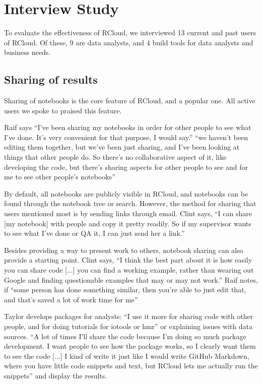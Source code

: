 \section{Interview Study\label{sec:interviews}}

To evaluate the effectiveness of RCloud, we interviewed 13 current and past
users of RCloud. Of these, 9 are data analysts, and 4 build tools for data
analysts and business needs.


\subsection{Sharing of results}
Sharing of notebooks is the core feature of RCloud, and a popular one. All
active users we spoke to praised this feature.


Raif says ``I've been sharing my notebooks in order for other people to see what
I've done. It's very convenient for that purpose, I would say.'' ``we haven't
been editing them together, but we've been just sharing, and I've been looking
at things that other people do. So there's no collaborative aspect of it, like
developing the code, but there's sharing aspects for other people to see and for
me to see other people's notebooks''

By default, all notebooks are publicly visible in RCloud, and notebooks can be
found through the notebook tree or search. However, the method for sharing that
users mentioned most is by sending links through email. Clint says, ``I can
share [my notebook] with people and copy it pretty readily. So if my supervisor
wants to see what I've done or QA it, I can just send her a link.''

Besides providing a way to present work to others, notebook sharing can also
provide a starting point. Clint says, ``I think the best part about it is how
easily you can share code [...] you can find a working example, rather than wearing
out Google and finding questionable examples that may or may not work.'' Raif
notes, if ``some person has done something similar, then you're able to just
edit that, and that's saved a lot of work time for me''

Taylor develops packages for analysts: ``I use it more for sharing code with
other people, and for doing tutorials for iotools or hmr'' or explaining issues
with data sources. ``A lot of times I'll share the code because I'm doing so
much package development. I want people to see how the package works, so I
clearly want them to see the code [...] I kind of write it just like I would write
GitHub Markdown, where you have little code snippets and text, but RCloud lets
me actually run the snippets'' and display the results.

